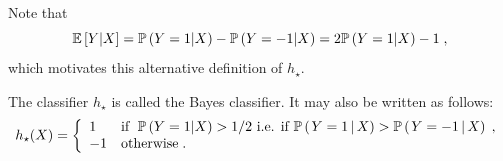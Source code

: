 Note that
\[
\mathbb{E}\left[Y\middle |X\right] = \mathbb{P}\left(Y=1\middle|X\right) - \mathbb{P}\left(Y=-1\middle|X\right) = 2\mathbb{P}\left(Y=1\middle|X\right) -1\;,
\]
which motivates this alternative definition of $h_{\star}$.
\begin{shaded}
\begin{definition} \label{def:bayesclassif}
The classifier $h_{\star}$ is called the Bayes classifier. It may also be written as follows:
\[
h_{\star}(X) = \left\{
    \begin{array}{ll}
       1 & \mbox{if }\; \bP\left(Y=1\middle|X\right)>1/2 \mbox{ i.e. if } \CPP{Y=1}{X}>\CPP{Y=-1}{X}\eqsp, \\
        -1 & \mbox{otherwise}\eqsp.
    \end{array}
\right.
\]
\end{definition}
\end{shaded}
